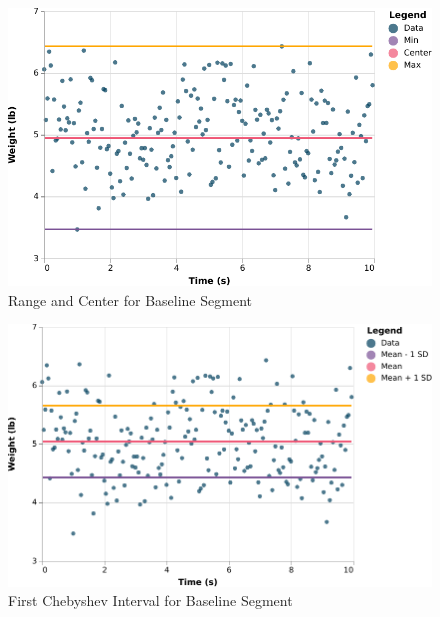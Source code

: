 \begin{figure}
    \centering
    \includegraphics{chart/00-intro/baseline-min-center-max.pdf}
    \caption{Range and Center for Baseline Segment}
    \label{figure.00.baseline.center}
\end{figure}
\begin{figure}
    \centering
    \includegraphics{chart/00-intro/baseline-chebyshev-1.pdf}
    \caption{First Chebyshev Interval for Baseline Segment}
    \label{figure.00.baseline.chebyshev.1}
\end{figure}
